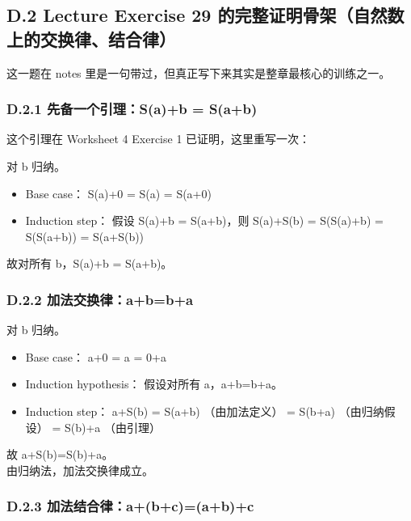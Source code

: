 \documentclass[
  11pt,
]{article}
\begin{document}
\subsection{D.2 Lecture Exercise 29
的完整证明骨架（自然数上的交换律、结合律）}\label{d.2-lecture-exercise-29-ux7684ux5b8cux6574ux8bc1ux660eux9aa8ux67b6ux81eaux7136ux6570ux4e0aux7684ux4ea4ux6362ux5f8bux7ed3ux5408ux5f8b}

这一题在 notes 里是一句带过，但真正写下来其实是整章最核心的训练之一。

\subsubsection{D.2.1 先备一个引理：S(a)+b =
S(a+b)}\label{d.2.1-ux5148ux5907ux4e00ux4e2aux5f15ux7406sab-sab}

这个引理在 Worksheet 4 Exercise 1 已证明，这里重写一次：

对 b 归纳。

\begin{itemize}
\item
  Base case： S(a)+0 = S(a) = S(a+0)
\item
  Induction step： 假设 S(a)+b = S(a+b)，则 S(a)+S(b) = S(S(a)+b) =
  S(S(a+b)) = S(a+S(b))
\end{itemize}

故对所有 b，S(a)+b = S(a+b)。

\subsubsection{D.2.2
加法交换律：a+b=b+a}\label{d.2.2-ux52a0ux6cd5ux4ea4ux6362ux5f8babba}

对 b 归纳。

\begin{itemize}
\item
  Base case： a+0 = a = 0+a
\item
  Induction hypothesis： 假设对所有 a，a+b=b+a。
\item
  Induction step： a+S(b) = S(a+b) （由加法定义） = S(b+a)
  （由归纳假设） = S(b)+a （由引理）
\end{itemize}

故 a+S(b)=S(b)+a。\\
由归纳法，加法交换律成立。

\subsubsection{D.2.3
加法结合律：a+(b+c)=(a+b)+c}\label{d.2.3-ux52a0ux6cd5ux7ed3ux5408ux5f8babcabc}
\end{document}
